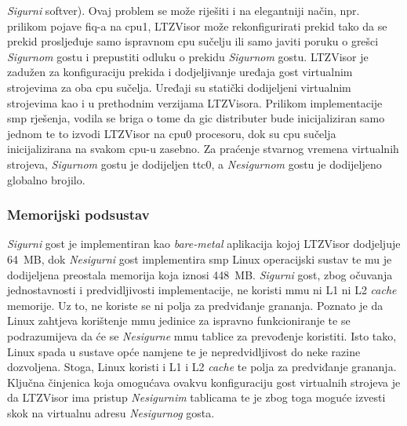 \documentclass[times, utf8, diplomski, numeric]{fer}
\begin{document}
\textit{Sigurni} softver). Ovaj problem se može riješiti i na elegantniji način, npr. prilikom pojave \gls{fiq}-a na \gls{cpu}1, LTZVisor
može rekonfigurirati prekid tako da se prekid prosljeđuje samo ispravnom \gls{cpu} sučelju ili samo javiti poruku o grešci
\textit{Sigurnom} gostu i prepustiti odluku o prekidu \textit{Sigurnom} gostu. LTZVisor je zadužen za konfiguraciju prekida
i dodjeljivanje uređaja gost virtualnim strojevima za oba \gls{cpu} sučelja. Uređaji su statički dodijeljeni virtualnim strojevima
kao i u prethodnim verzijama LTZVisora. Prilikom implementacije \gls{smp} rješenja, vodila se briga
o tome da \gls{gic} distributer bude inicijaliziran samo jednom te to izvodi LTZVisor na \gls{cpu}0 procesoru, dok su \gls{cpu} sučelja
inicijalizirana na svakom \gls{cpu}-u zasebno. Za praćenje stvarnog vremena virtualnih strojeva, \textit{Sigurnom} gostu je
dodijeljen \gls{ttc}0, a \textit{Nesigurnom} gostu je dodijeljeno globalno brojilo.

\subsubsection{Memorijski podsustav}
\textit{Sigurni} gost je implementiran kao \textit{bare-metal} aplikacija kojoj LTZVisor dodjeljuje 64~MB, dok
\textit{Nesigurni} gost implementira \gls{smp} Linux operacijski sustav te mu je dodijeljena preostala memorija koja iznosi 448~MB.
\textit{Sigurni} gost, zbog očuvanja jednostavnosti i predvidljivosti implementacije, ne koristi \gls{mmu} ni L1 ni L2 \textit{cache}
memorije. Uz to, ne koriste se ni polja za predviđanje grananja. Poznato je da Linux zahtjeva korištenje \gls{mmu} jedinice za
ispravno funkcioniranje te se podrazumijeva da će se \textit{Nesigurne} \gls{mmu} tablice za prevođenje koristiti. Isto tako, Linux
spada u sustave opće namjene te je nepredvidljivost do neke razine dozvoljena. Stoga, Linux koristi i L1 i L2 \textit{cache} te
polja za predviđanje grananja. Ključna činjenica koja omogućava ovakvu konfiguraciju gost virtualnih strojeva je da
LTZVisor ima pristup \textit{Nesigurnim} tablicama te je zbog toga moguće izvesti skok na virtualnu adresu
\textit{Nesigurnog} gosta.
\end{document}
